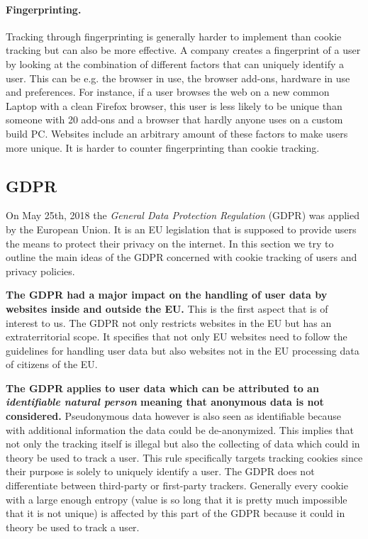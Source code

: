 \paragraph{Fingerprinting.}

Tracking through fingerprinting is generally harder to implement than cookie tracking but can also be more effective. A company
creates a fingerprint of a user by looking at the combination of different factors that can uniquely identify a user. This can
be e.g. the browser in use, the browser add-ons, hardware in use and preferences. For instance, if a user browses the
web on a new common Laptop with a clean Firefox browser, this user is less
likely to be unique than someone with 20 add-ons and a browser that hardly anyone uses on a custom build PC.
Websites include an arbitrary amount of these factors to make users more unique. It is harder to counter fingerprinting
than cookie tracking.

\subsection{GDPR}

On May 25th, 2018 the \emph{General Data Protection Regulation} (GDPR) was applied by the European Union. It is an EU
legislation that is supposed to provide users the means to protect their privacy on the internet. In this section we try
to outline the main ideas of the GDPR concerned with cookie tracking of users and privacy policies.

\textbf{The GDPR had a major impact on the handling of user data by websites inside and outside the EU.} This is the first
aspect that is of interest to us. The GDPR not only restricts websites in the EU but has an extraterritorial scope.
It specifies that not only EU websites need to follow the guidelines for handling user data but also websites not in the
EU processing data of citizens of the EU.

\textbf{The GDPR applies to user data which can be attributed to an \emph{identifiable natural person} meaning that anonymous
data is not considered.} Pseudonymous data however is also seen as identifiable because with additional information
the data could be de-anonymized. This implies that not only the tracking itself is illegal but also the collecting of data
which could in theory be used to track a user. This rule specifically targets tracking cookies since their purpose is
solely to uniquely identify a user. The GDPR does not differentiate between third-party or first-party trackers.
Generally every cookie with a large enough entropy (value is so long that it is pretty much impossible that it is not
unique) is affected by this part of the GDPR because it could in theory be used to track a user.

